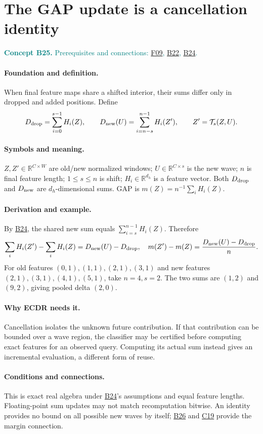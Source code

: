 \documentclass[11pt,a4paper]{article}
\newcommand{\R}{\mathbb R}
\newcommand{\conceptid}{Front matter}
\newcommand{\concept}[3]{\clearpage\renewcommand{\conceptid}{#1}%
\section{#2}\label{concept:#1}%
\textcolor{teal}{\textbf{Concept #1.} Prerequisites and connections: #3.}\par
\typeout{ECDR-CONCEPT-START #1 PAGE=\thepage}}
\begin{document}
\concept{B25}{The GAP update is a cancellation identity}{\hyperref[concept:F09]{F09}, \hyperref[concept:B22]{B22}, \hyperref[concept:B24]{B24}}
\paragraph{Foundation and definition.}
When final feature maps share a shifted interior, their sums differ only
in dropped and added positions. Define
\[
 D_{\rm drop}=\sum_{i=0}^{s-1}H_i(Z),\qquad
 D_{\rm new}(U)=\sum_{i=n-s}^{n-1}H_i(Z'),
 \qquad Z'=\mathcal T_s(Z,U).
\]
\paragraph{Symbols and meaning.}
$Z,Z'\in\R^{C\times W}$ are old/new normalized windows; $U\in\R^{C\times s}$
is the new wave; $n$ is final feature length; $1\le s\le n$ is shift;
$H_i\in\R^{d_h}$ is a feature vector. Both $D_{\rm drop}$ and
$D_{\rm new}$ are $d_h$-dimensional sums. GAP is
$m(Z)=n^{-1}\sum_iH_i(Z)$.
\paragraph{Derivation and example.}
By \hyperref[concept:B24]{B24}, the shared new sum equals $\sum_{i=s}^{n-1}H_i(Z)$. Therefore
\[
 \sum_iH_i(Z')-\sum_iH_i(Z)=D_{\rm new}(U)-D_{\rm drop},
 \quad m(Z')-m(Z)=\frac{D_{\rm new}(U)-D_{\rm drop}}n.
\]
For old features $(0,1),(1,1),(2,1),(3,1)$ and new features
$(2,1),(3,1),(4,1),(5,1)$, take $n=4,s=2$.
The two sums are $(1,2)$ and $(9,2)$, giving pooled delta $(2,0)$.
\paragraph{Why ECDR needs it.}
Cancellation isolates the unknown future contribution. If that contribution
can be bounded over a wave region, the classifier may be certified before
computing exact features for an observed query. Computing its actual sum
instead gives an incremental evaluation, a different form of reuse.
\paragraph{Conditions and connections.}
This is exact real algebra under \hyperref[concept:B24]{B24}'s assumptions and equal feature
lengths. Floating-point sum updates may not match recomputation bitwise.
An identity provides no bound on all possible new waves by itself;
\hyperref[concept:B26]{B26} and \hyperref[concept:C19]{C19} provide the margin connection.
\par\label{endconcept:B25}
\end{document}
